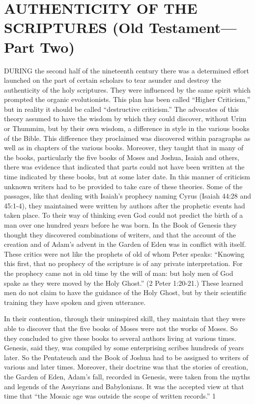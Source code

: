 \chapter{AUTHENTICITY OF THE SCRIPTURES (Old Testament—Part Two)}

DURING the second half of the nineteenth century there was a determined effort launched on
the part of certain scholars to tear asunder and destroy the authenticity of the holy scriptures.
They were influenced by the same spirit which prompted the organic evolutionists. This plan
has been called ``Higher Criticism,'' but in reality it should be called ``destructive criticism.''
The advocates of this theory assumed to have the wisdom by which they could discover,
without Urim or Thummim, but by their own wisdom, a difference in style in the various
books of the Bible. This difference they proclaimed was discovered within paragraphs as
well as in chapters of the various books. Moreover, they taught that in many of the books,
particularly the five books of Moses and Joshua, Isaiah and others, there was evidence that
indicated that parts could not have been written at the time indicated by these books, but at
some later date. In this manner of criticism unknown writers had to be provided to take care
of these theories. Some of the passages, like that dealing with Isaiah's prophecy naming
Cyrus (Isaiah 44:28 and 45:1-4), they maintained were written by authors after the prophetic
events had taken place. To their way of thinking even God could not predict the birth of a
man over one hundred years before he was born. In the Book of Genesis they thought they
discovered combinations of writers, and that the account of the creation and of Adam's
advent in the Garden of Eden was in conflict with itself. These critics were not like the
prophets of old of whom Peter speaks: ``Knowing this first, that no prophecy of the scripture
is of any private interpretation. For the prophecy came not in old time by the will of man: but
holy men of God spake as they were moved by the Holy Ghost.'' (2 Peter 1:20-21.) These
learned men do not claim to have the guidance of the Holy Ghost, but by their scientific
training they have spoken and given utterance.

In their contention, through their uninspired skill, they maintain that they were able to
discover that the five books of Moses were not the works of Moses. So they concluded to
give these books to several authors living at various times. Genesis, said they, was compiled
by some enterprising scribes hundreds of years later. So the Pentateuch and the Book of
Joshua had to be assigned to writers of various and later times. Moreover, their doctrine was
that the stories of creation, the Garden of Eden, Adam's fall, recorded in Genesis, were taken
from the myths and legends of the Assyrians and Babylonians. It was the accepted view at
that time that ``the Mosaic age was outside the scope of written records.'' 1

